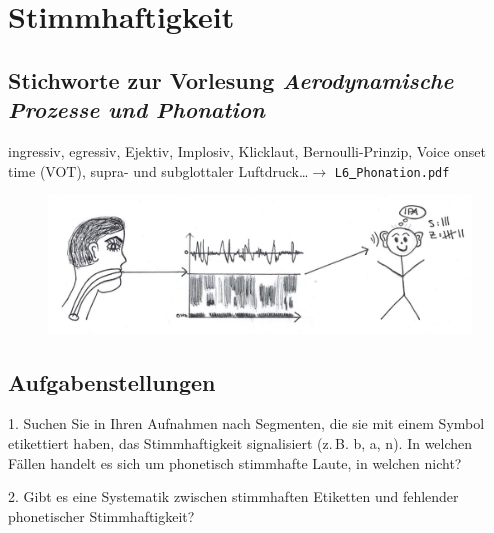 \documentclass[11pt]{book}
\begin{document}
\chapter{Stimmhaftigkeit}

\section{Stichworte zur Vorlesung \em{Aerodynamische Prozesse und Phonation}}

ingressiv, egressiv, Ejektiv, Implosiv, Klicklaut, Bernoulli-Prinzip, Voice onset time (VOT), supra- und subglottaler Luftdruck\dots $\rightarrow$ {\tt L6\underline{\ }Phonation.pdf}

\begin{figure}[htbp]
\begin{center}
\includegraphics[width=\textwidth]{grafiken/stimmhaftigkeit/stimmhaftigkeit}
\label{t4}
\end{center}
\end{figure}


\newpage
\section{Aufgabenstellungen}

1.	Suchen Sie in Ihren Aufnahmen nach Segmenten, die sie mit einem Symbol etikettiert haben, das Stimmhaftigkeit signalisiert (z.\,B. b, a, n). In welchen Fällen handelt es sich um phonetisch stimmhafte Laute, in welchen nicht?
\vspace{4cm}

2.	Gibt es eine Systematik zwischen stimmhaften Etiketten und fehlender phonetischer Stimmhaftigkeit?
\vspace{4cm}
\end{document}
